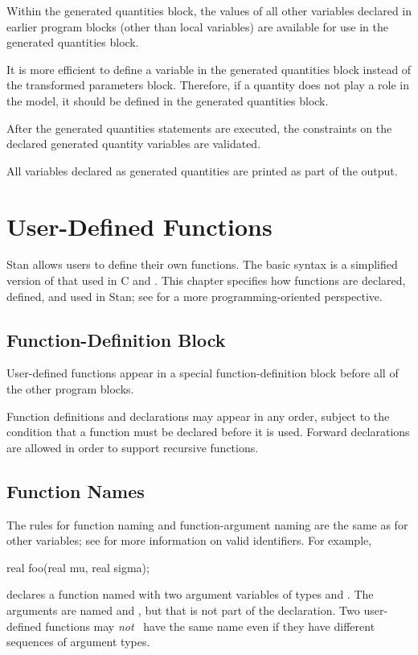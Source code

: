 Within the generated quantities block, the values of all other variables
declared in earlier program blocks (other than local variables) are
available for use in the generated quantities block.

It is more efficient to define a variable in the generated quantities
block instead of the transformed parameters block.  Therefore, if a
quantity does not play a role in the model, it should be defined in
the generated quantities block.

After the generated quantities statements are executed, the constraints
on the declared generated quantity variables are validated.

All variables declared as generated quantities are printed as part of
the output.

\chapter{User-Defined Functions}\label{functions.chapter}%
%
\noindent
Stan allows users to define their own functions.  The basic syntax is
a simplified version of that used in C and \Cpp.  This chapter
specifies how functions are declared, defined, and used in Stan; see
 for a more programming-oriented
perspective.

\section{Function-Definition Block}

User-defined functions appear in a special function-definition block
before all of the other program blocks.
%
\begin{stancode}
functions {
   // ... function declarations and definitions ...
}
data {
  // ...
\end{stancode}
%
Function definitions and declarations may appear in any order, subject
to the condition that a function must be declared before it is used.
Forward declarations are allowed in order to support recursive
functions.

\section{Function Names}

The rules for function naming and function-argument naming are the
same as for other variables; see  for more
information on valid identifiers.  For example,
%
\begin{stancode}
real foo(real mu, real sigma);
\end{stancode}
%
declares a function named  with two argument variables of
types  and .  The arguments are named 
and , but that is not part of the declaration.  Two
user-defined functions may \emph{not} \, have the same name even if they have
different sequences of argument types.

